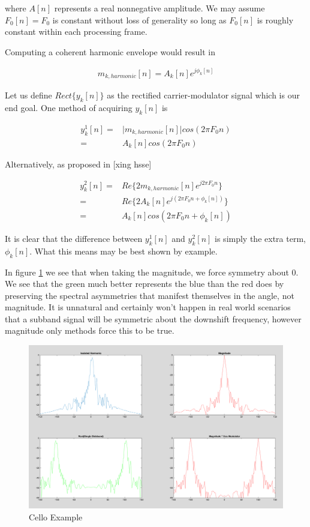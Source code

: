 \documentclass [11pt, proquest] {uwthesis}[2015/03/03]
\begin{document}
where $A[n]$ represents a real nonnegative amplitude.  We may assume $F_0[n] = F_0$ is constant without loss of generality so long as $F_0[n]$ is roughly constant within each processing frame.

Computing a coherent harmonic envelope would result in

\begin{align}
m_{k,harmonic}[n] = A_k[n]e^{j\phi_k[n]}
\end{align}

Let us define $Rect\{y_k[n]\}$ as the rectified carrier-modulator signal which is our end goal.  One method of acquiring $y_k[n]$ is

\begin{align}
\label{eq:realVSmag1}
y_k^1[n] =& \vert m_{k,harmonic}[n] \vert cos(2\pi F_0 n) \\
=& A_k[n] cos(2\pi F_0 n) \nonumber
\end{align}

Alternatively, as proposed in [xing hsse]

\begin{align}
y_k^2[n] =& Re\{ 2m_{k,harmonic}[n] e^{j2\pi F_0 n} \}  \\
=& Re\{ 2A_k[n]e^{j(2\pi F_0 n + \phi_k[n])} \} \nonumber \\
=& A_k[n]cos(2\pi F_0 n + \phi_k[n]) \nonumber
\end{align}

It is clear that the difference between $y_k^1[n]$ and $y_k^2[n]$ is simply the extra term, $\phi_k[n]$.  What this means may be best shown by example.

In figure \ref{fig:real_vs_magnitude_example} we see that when taking the magnitude, we force symmetry about $0$.  We see that the green much better represents the blue than the red does by preserving the spectral asymmetries that manifest themselves in the angle, not magnitude.  It is unnatural and certainly won't happen in real world scenarios that a subband signal will be symmetric about the downshift frequency, however magnitude only methods force this to be true.

\begin{figure}[!ht]
  \centering
    \includegraphics[width=1\textwidth]{real_vs_magnitude_example}   
    \caption{Cello Example}
    \label{fig:real_vs_magnitude_example}
\end{figure}
\end{document}
